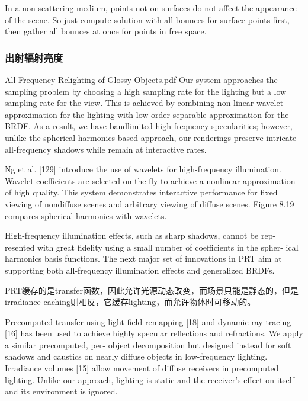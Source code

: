 In a non-scattering medium, points not on surfaces do not affect the appearance of the scene. So just compute solution with all bounces for surface points first, then gather all bounces at once for points in free space.


\subsubsection{出射辐射亮度}




All-Frequency Relighting of Glossy Objects.pdf
Our system approaches the sampling problem by choosing a high sampling rate for the lighting but a low sampling rate for the view. This is achieved by combining non-linear wavelet approximation for the lighting with low-order separable approximation for the BRDF. As a result, we have bandlimited high-frequency specularities; however, unlike the spherical harmonics based approach, our renderings preserve intricate all-frequency shadows while remain at interactive rates.



Ng et al. [129] introduce the use of wavelets for high-frequency illumination. Wavelet coefficients are selected on-the-fly to achieve a nonlinear approximation of high quality. This system demonstrates interactive performance for fixed viewing of nondiffuse scenes and arbitrary viewing of diffuse scenes. Figure 8.19 compares spherical harmonics with wavelets.

High-frequency illumination effects, such as sharp shadows, cannot be rep- resented with great fidelity using a small number of coefficients in the spher- ical harmonics basis functions. The next major set of innovations in PRT aim at supporting both all-frequency illumination effects and generalized BRDFs.











PRT缓存的是transfer函数，因此允许光源动态改变，而场景只能是静态的，但是irradiance caching则相反，它缓存lighting，而允许物体时可移动的。


Precomputed transfer using light-field remapping [18] and dynamic ray tracing [16] has been used to achieve highly specular reflections and refractions. We apply a similar precomputed, per- object decomposition but designed instead for soft shadows and caustics on nearly diffuse objects in low-frequency lighting. Irradiance volumes [15] allow movement of diffuse receivers in precomputed lighting. Unlike our approach, lighting is static and the receiver’s effect on itself and its environment is ignored.


